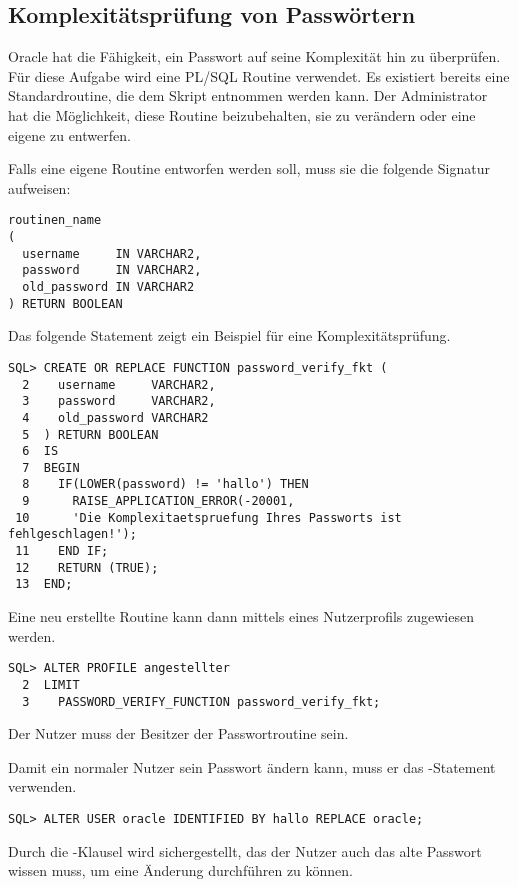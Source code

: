       \subsection{Komplexit\"atspr\"ufung von Passw\"ortern}
        Oracle hat die F\"ahigkeit, ein Passwort auf seine Komplexit\"at hin zu \"uberpr\"ufen. F\"ur diese Aufgabe wird eine PL/SQL Routine verwendet. Es existiert bereits eine Standardroutine, die dem Skript  entnommen werden kann. Der Administrator hat die M\"oglichkeit, diese Routine beizubehalten, sie zu ver\"andern oder eine eigene zu entwerfen.

        Falls eine eigene Routine entworfen werden soll, muss sie die folgende Signatur aufweisen:
        \begin{lstlisting}[caption={Format der Passwortroutine},label=admin224,language=plsql]
routinen_name
(
  username     IN VARCHAR2,
  password     IN VARCHAR2,
  old_password IN VARCHAR2
) RETURN BOOLEAN
        \end{lstlisting}
        Das folgende Statement zeigt ein Beispiel f\"ur eine Komplexit\"atspr\"ufung.
        \begin{lstlisting}[caption={Beispielkomplexit\"atsroutine},label=admin225, language=plsql]
SQL> CREATE OR REPLACE FUNCTION password_verify_fkt (
  2    username     VARCHAR2,
  3    password     VARCHAR2,
  4    old_password VARCHAR2
  5  ) RETURN BOOLEAN
  6  IS
  7  BEGIN
  8    IF(LOWER(password) != 'hallo') THEN
  9      RAISE_APPLICATION_ERROR(-20001,
 10      'Die Komplexitaetspruefung Ihres Passworts ist fehlgeschlagen!');
 11    END IF;
 12    RETURN (TRUE);
 13  END;
        \end{lstlisting}
        Eine neu erstellte Routine kann dann mittels eines Nutzerprofils zugewiesen werden.
        \begin{lstlisting}[caption={Passwortroutine
        zuweisen},label=admin226,language=oracle_sql]
SQL> ALTER PROFILE angestellter
  2  LIMIT
  3    PASSWORD_VERIFY_FUNCTION password_verify_fkt;
        \end{lstlisting}
        \begin{merke}
          Der Nutzer  muss der Besitzer der Passwortroutine sein.
        \end{merke}
        Damit ein normaler Nutzer sein Passwort \"andern kann, muss er das
        -Statement verwenden.
        \begin{lstlisting}[caption={Ein Nutzer \"andert sein Passwort}, label=admin227, language=oracle_sql]
SQL> ALTER USER oracle IDENTIFIED BY hallo REPLACE oracle;
        \end{lstlisting}
        Durch die -Klausel wird sichergestellt, das der Nutzer auch das alte Passwort wissen muss, um eine \"Anderung durchf\"uhren zu k\"onnen.
